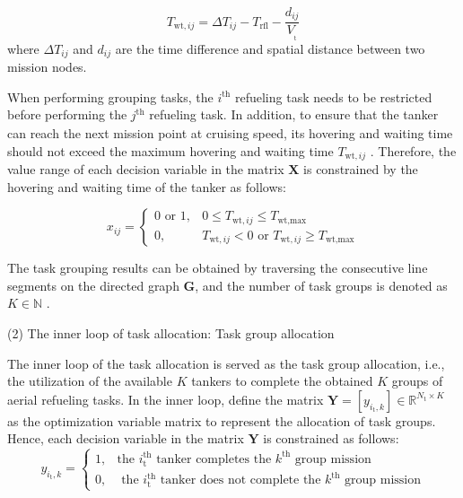 \begin{equation}
T_{\text{wt},{ij}}=\Delta T_{ij}-T_{\text{rfl}}-\frac{d_{ij}}{V_{_\text{t}}}
\label{eq:15.39}
\end{equation}
where  $\Delta T_{ij}$ and $d_{ij}$  are the time difference and spatial distance between two mission nodes.

When performing grouping tasks, the $i_{}^{\text{th}}$  refueling task needs to be restricted before performing the $j_{}^{\text{th}}$  refueling task. In addition, to ensure that the tanker can reach the next mission point at cruising speed, its hovering and waiting time should not exceed the maximum hovering and waiting time $T_{\text{wt},{ij}}$ . Therefore, the value range of each decision variable in the matrix $\mathbf{X}$ is constrained by the hovering and waiting time of the tanker as follows:

\begin{equation}
x_{ij}=\begin{cases}0\text{ or }1,&0\le T_{\text{wt},{ij}}\le T_{\text{wt},\text{max}}\\0,&T_{\text{wt},{ij}}<0\text{ or }T_{\text{wt},{ij}}\ge T_{\text{wt},\text{max}}\end{cases}
\label{eq:15.40}
\end{equation}

The task grouping results can be obtained by traversing the consecutive line segments on the directed graph $\mathbf{G}$, and the number of task groups is denoted as $K\in\mathbb{N}$ .

(2) The inner loop of task allocation: Task group allocation

The inner loop of the task allocation is served as the task group allocation, i.e., the utilization of the available $K$ tankers to complete the obtained $K$ groups of aerial refueling tasks. In the inner loop, define the matrix $\mathbf{Y}=\left[y_{i_\text{t},k}\right]\in\mathbb{R}^{N_{\text{t}}\times K}$ as the optimization variable matrix to represent the allocation of task groups. Hence, each decision variable in the matrix $\mathbf{Y}$ is constrained as follows:
\begin{equation}
y_{i_\text{t},k}=\begin{cases}1,&\text{the }i_\text{t}^\text{th}\text{ tanker completes the }k^\text{th}\text{ group mission}\\0,&\text{ the }i_\mathrm{t}^\text{th}\text{ tanker does not complete the }k^\text{th}\text{ group mission}\end{cases}
\label{eq:15.41}
\end{equation}

